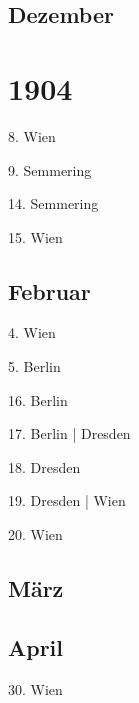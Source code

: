 \documentclass[twoside=false,titlepage=false,open=any, parskip=never, fontsize=10pt, headings=small, chapterprefix=false, appendixprefix=false, DIV=15]{scrbook}
\begin{document}
\begin{multicols}{3}
            \section*{Dezember}
            \chapter*{1904}
            8. Wien\par
            9. Semmering\par
            14. Semmering\par
            15. Wien\par
            \section*{Februar}
            4. Wien\par
            5. Berlin\par
            16. Berlin\par
            17. Berlin | Dresden\par
            18. Dresden\par
            19. Dresden | Wien\par
            20. Wien\par
            \section*{März}
            \section*{April}
            30. Wien\par

\end{multicols}
\end{document}
